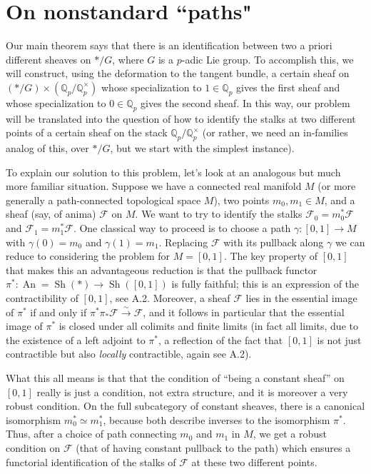 \documentclass[12pt]{article}
\begin{document}
\section{On nonstandard ``paths"}\label{pathsec}

Our main theorem says that there is an identification between two a priori different sheaves on $*/G$, where $G$ is a $p$-adic Lie group.  To accomplish this, we will construct, using the deformation to the tangent bundle, a certain sheaf on $(*/G)\times (\mathbb{Q}_p/\mathbb{Q}_p^\times)$ whose specialization to $1\in \mathbb{Q}_p$ gives the first sheaf and whose specialization to $0\in \mathbb{Q}_p$ gives the second sheaf.  In this way, our problem will be translated into the question of how to identify the stalks at two different points of a certain sheaf on the stack $\mathbb{Q}_p/\mathbb{Q}_p^\times$ (or rather, we need an in-families analog of this, over $\ast/G$, but we start with the simplest instance).

To explain our solution to this problem, let's look at an analogous but much more familiar situation.  Suppose we have a connected real manifold $M$ (or more generally a path-connected topological space $M$), two points $m_0,m_1\in M$, and a sheaf (say, of anima) $\mathcal{F}$ on $M$.  We want to try to identify the stalks $\mathcal{F}_0=m_0^\ast\mathcal{F}$ and $\mathcal{F}_1=m_1^\ast\mathcal{F}$.  One classical way to proceed is to choose a path $\gamma:[0,1]\rightarrow M$ with $\gamma(0)=m_0$ and $\gamma(1)=m_1$.  Replacing $\mathcal{F}$ with its pullback along $\gamma$ we can reduce to considering the problem for $M=[0,1]$.  The key property of $[0,1]$ that makes this an advantageous reduction is that the pullback functor $\pi^\ast:\operatorname{An}=\operatorname{Sh}(\ast)\rightarrow \operatorname{Sh}([0,1])$ is fully faithful; this is an expression of the contractibility of $[0,1]$, see \cite{LurieHA} A.2.  Moreover, a sheaf $\mathcal{F}$ lies in the essential image of $\pi^\ast$ if and only if $\pi^\ast\pi_\ast\mathcal{F}\overset{\sim}{\rightarrow}\mathcal{F}$, and it follows in particular that the essential image of $\pi^\ast$ is closed under all colimits and finite limits (in fact all limits, due to the existence of a left adjoint to $\pi^\ast$, a reflection of the fact that $[0,1]$ is not just contractible but also \emph{locally} contractible, again see \cite{LurieHA} A.2).


What this all means is that that the condition of ``being a constant sheaf'' on $[0,1]$ really is just a condition, not extra structure, and it is moreover a very robust condition.   On the full subcategory of constant sheaves, there is a canonical isomorphism $m_0^\ast\simeq m_1^\ast$, because both describe inverses to the isomorphism $\pi^\ast$. Thus, after a choice of path connecting $m_0$ and $m_1$ in $M$, we get a robust condition on $\mathcal{F}$ (that of having constant pullback to the path) which ensures a functorial identification of the stalks of $\mathcal{F}$ at these two different points.
\end{document}
